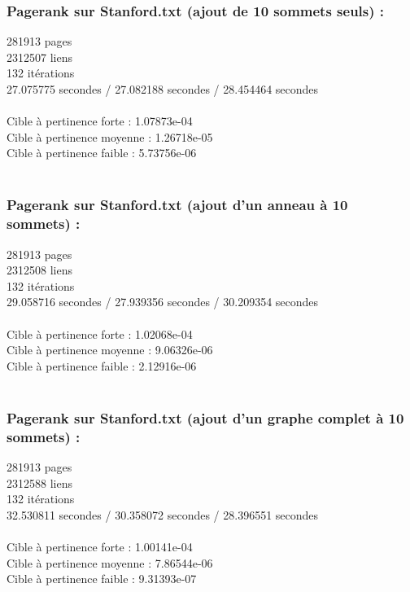 \documentclass[a4paper,11pt]{article}
\begin{document}
		\subsubsection{Pagerank sur Stanford.txt (ajout de 10 sommets seuls) :}
			281913 pages\\
			2312507 liens\\
			132 itérations\\
			27.075775 secondes / 27.082188 secondes / 28.454464 secondes\\
			\\
			Cible à pertinence forte : 1.07873e-04\\
			Cible à pertinence moyenne : 1.26718e-05\\
			Cible à pertinence faible : 5.73756e-06\\
			\\
		\subsubsection{Pagerank sur Stanford.txt (ajout d'un anneau à 10 sommets) :}
			281913 pages\\
			2312508 liens\\
			132 itérations\\
			29.058716 secondes / 27.939356 secondes / 30.209354 secondes\\
			\\
			Cible à pertinence forte : 1.02068e-04\\
			Cible à pertinence moyenne : 9.06326e-06\\
			Cible à pertinence faible : 2.12916e-06\\
			\\
		\subsubsection{Pagerank sur Stanford.txt (ajout d'un graphe complet à 10 sommets) :}
			281913 pages\\
			2312588 liens\\
			132 itérations\\
			32.530811 secondes / 30.358072 secondes / 28.396551 secondes\\
			\\
			Cible à pertinence forte : 1.00141e-04\\	
			Cible à pertinence moyenne : 7.86544e-06\\
			Cible à pertinence faible : 9.31393e-07\\
			\\
\end{document}
